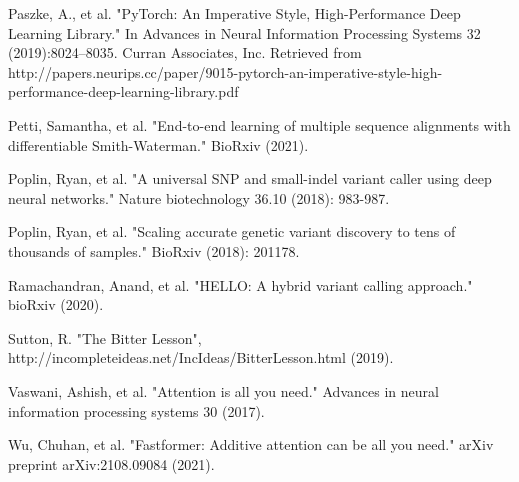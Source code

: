 \documentclass[]{article}
\begin{document}
\vspace{8pt}
Paszke, A., et al. "PyTorch: An Imperative Style, High-Performance Deep Learning Library." In Advances in Neural Information Processing Systems 32 (2019):8024–8035. Curran Associates, Inc. Retrieved from http://papers.neurips.cc/paper/9015-pytorch-an-imperative-style-high-performance-deep-learning-library.pdf

\vspace{8pt}
Petti, Samantha, et al. "End-to-end learning of multiple sequence alignments with differentiable Smith-Waterman." BioRxiv (2021).

\vspace{8pt}
Poplin, Ryan, et al. "A universal SNP and small-indel variant caller using deep neural networks." Nature biotechnology 36.10 (2018): 983-987.

\vspace{8pt}
Poplin, Ryan, et al. "Scaling accurate genetic variant discovery to tens of thousands of samples." BioRxiv (2018): 201178.

\vspace{8pt}
Ramachandran, Anand, et al. "HELLO: A hybrid variant calling approach." bioRxiv (2020).
 
\vspace{8pt}
Sutton, R. "The Bitter Lesson", http://incompleteideas.net/IncIdeas/BitterLesson.html (2019).

\vspace{8pt}
Vaswani, Ashish, et al. "Attention is all you need." Advances in neural information processing systems 30 (2017).

\vspace{8pt}
Wu, Chuhan, et al. "Fastformer: Additive attention can be all you need." arXiv preprint arXiv:2108.09084 (2021).
\end{document}
